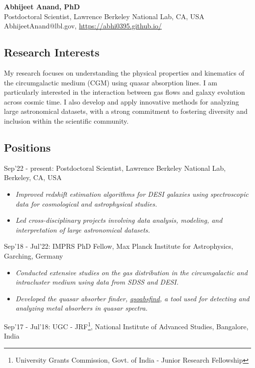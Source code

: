 \documentclass[12pt,letterpaper]{article}
\begin{document}
\thispagestyle{empty}\sloppy\sloppypar\raggedbottom

\textbf{\Large Abhijeet Anand, PhD}\\[0.5ex]
Postdoctoral Scientist, Lawrence Berkeley National Lab, CA, USA\\[0.5ex]
\textsf{\small AbhijeetAnand@lbl.gov, \href{https://abhi0395.github.io/}{https://abhi0395.github.io/}}\\[0.5ex]

\subsection{Research Interests}
My research focuses on understanding the physical properties and kinematics of the circumgalactic medium (CGM) using quasar absorption lines. I am particularly interested in the interaction between gas flows and galaxy evolution across cosmic time. I also develop and apply innovative methods for analyzing large astronomical datasets, with a strong commitment to fostering diversity and inclusion within the scientific community.

\subsection{Positions}
\begin{list}{}{\cvlist}
\item Sep'22 - present: Postdoctoral Scientist, Lawrence Berkeley National Lab, Berkeley, CA, USA \\
\begin{itemize}
  \item \emph{Improved redshift estimation algorithms for DESI galaxies using spectroscopic data for cosmological and astrophysical studies.}
  \item \emph{Led cross-disciplinary projects involving data analysis, modeling, and interpretation of large astronomical datasets.}
\end{itemize}
\item Sep'18 - Jul'22: IMPRS PhD Fellow, Max Planck Institute for Astrophysics, Garching, Germany
\begin{itemize}
\item \emph{Conducted extensive studies on the gas distribution in the circumgalactic and intracluster medium using data from SDSS and DESI.}
\item \emph{Developed the quasar absorber finder, \href{https://github.com/abhi0395/qsoabsfind}{qsoabsfind}, a tool used for detecting and analyzing metal absorbers in quasar spectra.}
\end{itemize}
\item Sep'17 - Jul'18: UGC - JRF\footnote{University Grants Commission, Govt. of India - Junior Research Fellowship}, National Institute of Advanced Studies, Bangalore, India
\end{list}
\end{document}
